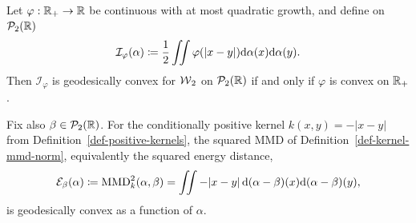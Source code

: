 \begin{prop}\label{prop-1d-interaction-halfline-convex}
	Let \(\varphi:\mathbb{R}_+\to\mathbb{R}\) be continuous with at most quadratic growth, and define on \(\mathcal{P}_2(\mathbb{R})\)
	\[
		\mathcal I_\varphi(\alpha)
		\coloneqq
		\frac12\iint \varphi(|x-y|)\mathrm{d}\alpha(x)\mathrm{d}\alpha(y).
	\]
	Then \(\mathcal I_\varphi\) is geodesically convex for \(\operatorname{\mathcal{W}}_2\) on \(\mathcal{P}_2(\mathbb{R})\) if and only if \(\varphi\) is convex on \(\mathbb{R}_+\).

	Fix also \(\beta\in\mathcal{P}_2(\mathbb{R})\). For the conditionally positive kernel \(k(x,y)=-|x-y|\) from Definition~\ref{def-positive-kernels}, the squared MMD of Definition~\ref{def-kernel-mmd-norm}, equivalently the squared energy distance,
	\[
		\mathcal E_\beta(\alpha)
		\coloneqq
		\operatorname{MMD}_k^2(\alpha,\beta)
		=
		\iint -|x-y|\,\mathrm{d}(\alpha-\beta)(x)\mathrm{d}(\alpha-\beta)(y),
	\]
	is geodesically convex as a function of \(\alpha\).
\end{prop}
